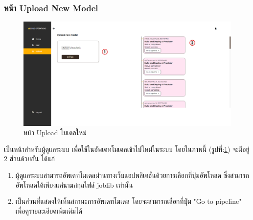 \documentclass[12pt,oneside,openright,a4paper]{cpe-thai-project}
\begin{document}
\subsubsection{หน้า Upload New Model}
\begin{figure}[!ht]\centering
  \includegraphics[width=15cm]{./img/project_ui/admin_up.png} 
  \caption{หน้า Upload โมเดลใหม่}\label{fig:admin_upload} 
\end{figure}
\hspace*{1cm}เป็นหน้าสำหรับผู้ดูแลระบบ เพื่อใช้ในอัพเดทโมเดลเข้าไปใหม่ในระบบ
โดยในภาพนี้ (รูปที่:\ref{fig:admin_upload}) จะมีอยู่ 2 ส่วนด้วยกัน ได้แก่
\begin{enumerate}
  \item ผู้ดูแลระบบสามารถอัพเดทโมเดลผ่านทางเว็บแอปพลิเคชันด้วยการเลือกที่ปุ่มอัพโหลด ซึ่งสามารถอัพโหลดได้เพียงแค่นามสกุลไฟล์ joblib เท่านั้น
  \item เป็นส่วนที่แสดงให้เห็นสถานะการอัพเดทโมเดล โดยจะสามารถเลือกที่ปุ่ม "Go to pipeline" เพื่อดูรายละเอียดเพิ่มเติมได้
\end{enumerate}
\end{document}

